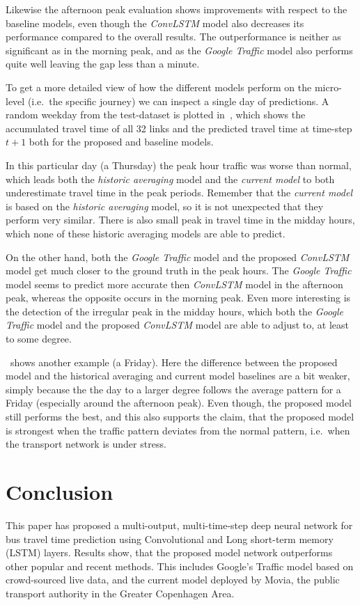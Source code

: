 \documentclass[preprint,11pt,5p,twocolumn]{elsarticle}
\begin{document}
Likewise the afternoon peak evaluation shows improvements with respect to the baseline models, even though the \emph{ConvLSTM} model also decreases its performance compared to the overall results. The outperformance is neither as significant as in the morning peak, and as the \emph{Google Traffic} model also performs quite well leaving the gap less than a minute. 

To get a more detailed view of how the different models perform on the micro-level (i.e.\ the specific journey) we can inspect a single day of predictions. A random weekday from the test-dataset is plotted in~, which shows the accumulated travel time of all 32 links and the predicted travel time at time-step $t + 1$ both for the proposed and baseline models.

In this particular day (a Thursday) the peak hour traffic was worse than normal, which leads both the \emph{historic averaging} model and the \emph{current model} to both underestimate travel time in the peak periods. Remember that the \emph{current model} is based on the \emph{historic averaging} model, so it is not unexpected that they perform very similar. There is also small peak in travel time in the midday hours, which none of these historic averaging models are able to predict.

On the other hand, both the \emph{Google Traffic} model and the proposed \emph{ConvLSTM} model get much closer to the ground truth in the peak hours. The \emph{Google Traffic} model seems to predict more accurate then \emph{ConvLSTM} model in the afternoon peak, whereas the opposite occurs in the morning peak. Even more interesting is the detection of the irregular peak in the midday hours, which both the \emph{Google Traffic} model and the proposed \emph{ConvLSTM} model are able to adjust to, at least to some degree.

~shows another example (a Friday). Here the difference between the proposed model and the historical averaging and current model baselines are a bit weaker, simply because the the day to a larger degree follows the average pattern for a Friday (especially around the afternoon peak). Even though, the proposed model still performs the best, and this also supports the claim, that the proposed model is strongest when the traffic pattern deviates from the normal pattern, i.e.\ when the transport network is under stress.

\section{Conclusion}
\label{sec:conclusion}
This paper has proposed a multi-output, multi-time-step deep neural network for bus travel time prediction using Convolutional and Long short-term memory (LSTM) layers. Results show, that the proposed model network outperforms other popular and recent methods. This includes Google's Traffic model based on crowd-sourced live data, and the current model deployed by Movia, the public transport authority in the Greater Copenhagen Area.
\end{document}

